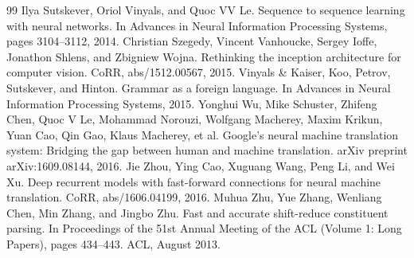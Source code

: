 \documentclass[conference]{IEEEtran}
\begin{document}
\begin{thebibliography}{99}
 Ilya Sutskever, Oriol Vinyals, and Quoc VV Le. Sequence to sequence learning with neural networks. In Advances in Neural Information Processing Systems, pages 3104--3112, 2014.
 Christian Szegedy, Vincent Vanhoucke, Sergey Ioffe, Jonathon Shlens, and Zbigniew Wojna. Rethinking the inception architecture for computer vision. CoRR, abs/1512.00567, 2015.
 Vinyals & Kaiser, Koo, Petrov, Sutskever, and Hinton. Grammar as a foreign language. In Advances in Neural Information Processing Systems, 2015.
 Yonghui Wu, Mike Schuster, Zhifeng Chen, Quoc V Le, Mohammad Norouzi, Wolfgang Macherey, Maxim Krikun, Yuan Cao, Qin Gao, Klaus Macherey, et al. Google's neural machine translation system: Bridging the gap between human and machine translation. arXiv preprint arXiv:1609.08144, 2016.
 Jie Zhou, Ying Cao, Xuguang Wang, Peng Li, and Wei Xu. Deep recurrent models with fast-forward connections for neural machine translation. CoRR, abs/1606.04199, 2016.
 Muhua Zhu, Yue Zhang, Wenliang Chen, Min Zhang, and Jingbo Zhu. Fast and accurate shift-reduce constituent parsing. In Proceedings of the 51st Annual Meeting of the ACL (Volume 1: Long Papers), pages 434--443. ACL, August 2013.
\end{thebibliography}
\end{document}

